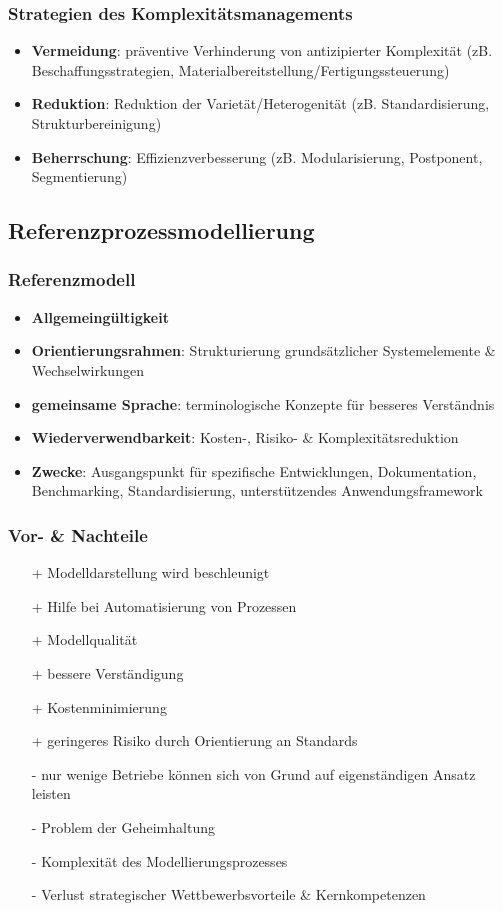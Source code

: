 \documentclass{article}
\begin{document}
\subsubsection{Strategien des Komplexitätsmanagements}
\begin{itemize}
  \item \textbf{Vermeidung}: präventive Verhinderung von antizipierter Komplexität (zB. Beschaffungsstrategien, Materialbereitstellung/Fertigungssteuerung)
  \item \textbf{Reduktion}: Reduktion der Varietät/Heterogenität (zB. Standardisierung, Strukturbereinigung)
  \item \textbf{Beherrschung}: Effizienzverbesserung (zB. Modularisierung, Postponent, Segmentierung)
\end{itemize}

\subsection{Referenzprozessmodellierung}

\subsubsection{Referenzmodell}
\begin{itemize}
  \item \textbf{Allgemeingültigkeit}
  \item \textbf{Orientierungsrahmen}: Strukturierung grundsätzlicher Systemelemente \& Wechselwirkungen
  \item \textbf{gemeinsame Sprache}: terminologische Konzepte für besseres Verständnis
  \item \textbf{Wiederverwendbarkeit}: Kosten-, Risiko- \& Komplexitätsreduktion
  \item \textbf{Zwecke}: Ausgangspunkt für spezifische Entwicklungen, Dokumentation, Benchmarking, Standardisierung, unterstützendes Anwendungsframework
\end{itemize}

\subsubsection{Vor- \& Nachteile}
\begin{itemize}
  \item[+] Modelldarstellung wird beschleunigt
  \item[+] Hilfe bei Automatisierung von Prozessen
  \item[+] Modellqualität
  \item[+] bessere Verständigung
  \item[+] Kostenminimierung
  \item[+] geringeres Risiko durch Orientierung an Standards
  \item[-] nur wenige Betriebe können sich von Grund auf eigenständigen Ansatz leisten
  \item[-] Problem der Geheimhaltung
  \item[-] Komplexität des Modellierungsprozesses
  \item[-] Verlust strategischer Wettbewerbsvorteile \& Kernkompetenzen
\end{itemize}
\end{document}
